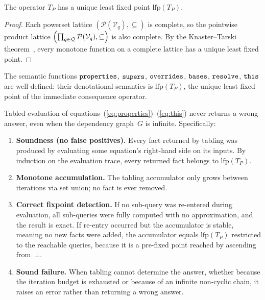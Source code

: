 \begin{theorem}\label{thm:lfp-exists}
  The operator $T_P$ has a unique least fixed point
  $\mathrm{lfp}(T_P)$.
\end{theorem}

\begin{proof}
  Each powerset lattice
  $(\mathcal{P}(\mathcal{V}_q), \subseteq)$
  is complete,
  so the pointwise product lattice
  $\Bigl(\prod_{q \in \mathcal{Q}} \mathcal{P}(\mathcal{V}_q), \subseteq\Bigr)$
  is also complete.
  By the Knaster--Tarski
  theorem~\cite{tarski1955-lattice-fixpoint-theorem},
  every monotone function on a complete lattice has a
  unique least fixed point.
\end{proof}

\begin{theorem}\label{thm:well-defined}
  The semantic functions
  $\mathtt{properties}$, $\mathtt{supers}$, $\mathtt{overrides}$, $\mathtt{bases}$,
  $\mathtt{resolve}$, $\mathtt{this}$ are well-defined:
  their denotational semantics is
  $\mathrm{lfp}(T_P)$, the unique least fixed point of
  the immediate consequence operator.
\end{theorem}

\begin{theorem}%
  \label{thm:tabling-soundness}
  Tabled evaluation of
  equations~(\ref{eq:properties})--(\ref{eq:this})
  never returns a wrong answer, even when the
  dependency graph~$G$ is infinite.
  Specifically:
  \begin{enumerate}
    \item \textbf{Soundness (no false positives).}
      Every fact returned by tabling was produced by
      evaluating some equation's right-hand side on its
      inputs.
      By induction on the evaluation trace, every
      returned fact belongs to $\mathrm{lfp}(T_P)$.

    \item \textbf{Monotone accumulation.}
      The tabling accumulator only grows between
      iterations via set union; no fact is ever
      removed.

    \item \textbf{Correct fixpoint detection.}
      If no sub-query was re-entered during evaluation,
      all sub-queries were fully computed with no
      approximation, and the result is exact.
      If re-entry occurred but the accumulator is
      stable, meaning no new facts were added, the
      accumulator equals
      $\mathrm{lfp}(T_P)$ restricted to the reachable
      queries, because it is a pre-fixed point reached
      by ascending from~$\bot$.

    \item \textbf{Sound failure.}
      When tabling cannot determine the answer,
      whether because the iteration budget is exhausted
      or because of an infinite non-cyclic chain,
      it raises an error rather than
      returning a wrong answer.
  \end{enumerate}
\end{theorem}

